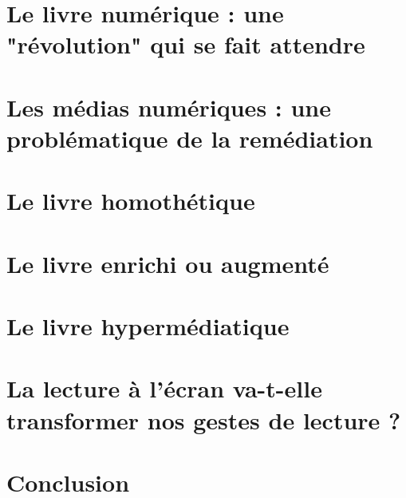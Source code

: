 \documentclass[svgnames,smaller,10pt]{beamer}
\begin{document}
\section{Le livre numérique : une "révolution" qui se fait attendre}


\section{Les médias numériques : une problématique de la remédiation}


\section{Le livre homothétique}


\section{Le livre enrichi ou augmenté}


\section{Le livre hypermédiatique}


\section{La lecture à l'écran va-t-elle transformer nos gestes de lecture ?}


\section{Conclusion}

\end{document}
